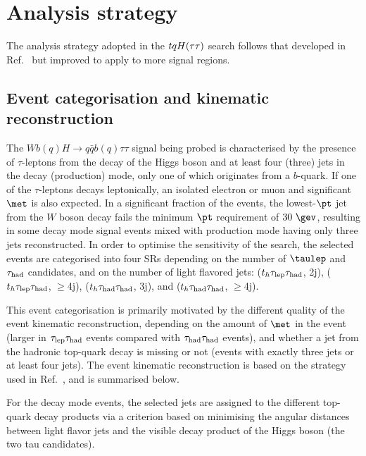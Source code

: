 \section{Analysis strategy}
\label{sec:strategy_Htautau}

The analysis strategy adopted in the $tqH(\tau\tau)$ search follows that developed in Ref.~\cite{Chen:2015nta} but improved to apply to more signal regions.

\subsection{Event categorisation and kinematic reconstruction}
\label{sec:htautau_reco_cat}

The $Wb(q)H\to q\bar{q}b(q)\tau\tau$ signal being probed is characterised by the presence of $\tau$-leptons from the decay of 
the Higgs boson and at least  four (three) jets in the decay (production) mode, only one of which originates from a $b$-quark.
If one of the $\tau$-leptons decays leptonically, an isolated electron or muon and significant $\met$ is also expected.
In a significant fraction of the events, the lowest-$\pt$ jet from the $W$ boson decay fails the minimum $\pt$ requirement of $30~\gev$,
resulting in some decay mode signal events mixed with production mode having only three jets reconstructed.
In order to optimise the sensitivity of the search, the selected events are categorised into four SRs depending 
on the number of $\taulep$ and $\tau_{\mathrm{had}}$ candidates, and on the number of light flavored jets:
($t_h\tau_{\mathrm{lep}} \tau_{\mathrm{had}}$, 2j), ($t_h\tau_{\mathrm{lep}} \tau_{\mathrm{had}}$, $\geq$4j), ($t_h\tau_{\mathrm{had}} \tau_{\mathrm{had}}$, 3j), and ($t_h\tau_{\mathrm{had}} \tau_{\mathrm{had}}$, $\geq$4j). 

This event categorisation is primarily motivated by the different quality of the event kinematic reconstruction, depending on the amount 
of $\met$ in the event (larger in $\tau_{\mathrm{lep}} \tau_{\mathrm{had}}$ events compared with $\tau_{\mathrm{had}} \tau_{\mathrm{had}}$ events), and whether a jet from the hadronic top-quark decay 
is missing or not (events with exactly three jets or at least four jets).
The event kinematic reconstruction is based on the strategy used in Ref.~\cite{Chen:2015nta}, and is summarised below.

For the decay mode events, the selected jets are assigned to the different top-quark decay products via a criterion based on 
minimising the angular distances between light flavor jets and the visible decay product of the Higgs boson (the two tau candidates).

